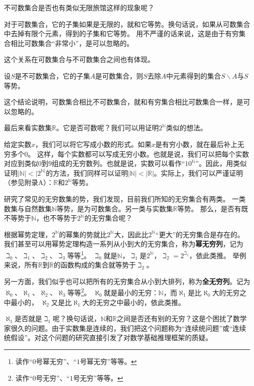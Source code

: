 \documentclass[12pt,UTF8,fontset=none]{ctexbook}
\begin{document}
不可数集合是否也有类似无限旅馆这样的现象呢？

对于可数集合，它的子集如果是无限的，就和它等势。换句话说，如果从可数集合中去掉有限个元素，得到的子集和它等势。
用不严谨的话来说，这是由于有穷集合相比可数集合“非常小”，是可以忽略的。

这个关系在可数集合与不可数集合之间也有体现。
\begin{tm}
    设$S$是不可数集合，它的子集$A$是可数集合，则$S$去除$A$中元素得到的集合$S\backslash A$与$S$等势。
\end{tm}

这个结论说明，可数集合相比不可数集合，就和有穷集合相比可数集合一样，是可以忽略的。

最后来看实数集$\mathbb{R}$。它是否可数呢？我们可以用证明$2^\mathbb{N}$类似的想法。

给定实数$x$，我们可以将它写成小数的形式。如果$x$是有穷小数，就在最后补上无穷多个$0$。
这样，每个实数都可以写成无穷小数。也就是说，我们可以把每个实数对应到类似$0$到$9$组成的无穷数列。也就是说，实数可以看作“$10^{\mathbb{N}}$”。因此，用类似证明$|\mathbb{N}|<|2^{\mathbb{N}|}$的方法，我们同样可以证明$|\mathbb{N}|<|\mathbb{R}|$。实际上，我们可以严谨证明（参见附录A）：$\mathbb{R}$和$2^\mathbb{N}$等势。

研究了常见的无穷数集的势，我们发现，目前我们所知的无穷集合有两类。
一类数集与自然数集$\mathbb{N}$等势，是为可数集合。另一类与实数集$\mathbb{R}$等势。
那么，是否有既不等势于$\mathbb{N}$，也不等势于$2^\mathbb{N}$的无穷集合呢？

根据幂势定理，$2^\mathbb{N}$的幂集的势就比$2^\mathbb{N}$大，因此比$2^\mathbb{N}$“更大”的无穷集合是存在的。
我们甚至可以用幂势定理构造一系列从小到大的无穷集合，称为\textbf{幂无穷列}，记为$\beth_0$、$\beth_1$、$\beth_2$、$\beth_3$等等\footnote{读作“$0$号幂无穷”、“$1$号幂无穷”等等。}。
$\beth_0$就是$\mathbb{N}$，$\beth_1$是$2^\mathbb{N}$，$\beth_2 = 2^{\beth_1}$，依此类推。
举例来说，所有$\mathbb{R}$到$\mathbb{R}$的函数构成的集合就等势于$\beth_2$。

另一方面，我们似乎也可以把所有的无穷集合从小到大排列，称为\textbf{全无穷列}。记为$\aleph_0$、$\aleph_1$、$\aleph_2$、$\aleph_3$等等\footnote{读作“$0$号无穷”、“$1$号无穷”等等。}。
$\aleph_0$就是最小的无穷：$\mathbb{N}$，而$\aleph_1$是比$\aleph_0$大的无穷之中最小的，
$\aleph_2$又是比$\aleph_1$大的无穷之中最小的，依此类推。

$\aleph_1$是否就是$\beth_1$呢？换句话说，$\mathbb{N}$和$\mathbb{R}$之间是否还有别的无穷？这是个困扰了数学家很久的问题。由于实数集是连续的，我们把这个问题称为“连续统问题”或“连续统假设”。对这个问题的研究直接引发了对数学基础推理框架的质疑。
\end{document}
